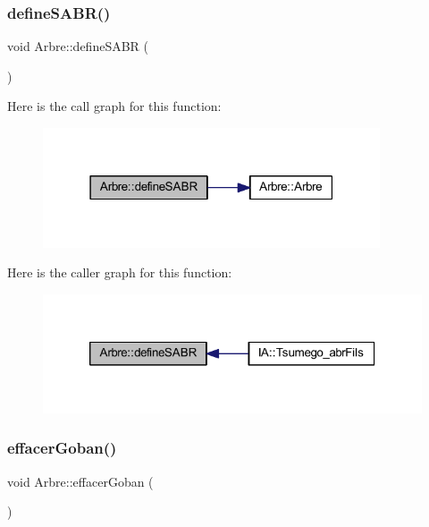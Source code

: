 \subsubsection{\texorpdfstring{define\+S\+A\+B\+R()}{defineSABR()}}
{\footnotesize\ttfamily void Arbre\+::define\+S\+A\+BR (\begin{DoxyParamCaption}{ }\end{DoxyParamCaption})}

Here is the call graph for this function\+:
\nopagebreak
\begin{figure}[H]
\begin{center}
\leavevmode
\includegraphics[width=283pt]{class_arbre_afecc9a49515e88dba06b10d1e0fadb76_cgraph}
\end{center}
\end{figure}
Here is the caller graph for this function\+:
\nopagebreak
\begin{figure}[H]
\begin{center}
\leavevmode
\includegraphics[width=320pt]{class_arbre_afecc9a49515e88dba06b10d1e0fadb76_icgraph}
\end{center}
\end{figure}
\mbox{\label{class_arbre_a8e5496c537aafd219a6b45bb356da2c0}} 
\subsubsection{\texorpdfstring{effacer\+Goban()}{effacerGoban()}}
{\footnotesize\ttfamily void Arbre\+::effacer\+Goban (\begin{DoxyParamCaption}{ }\end{DoxyParamCaption})}


